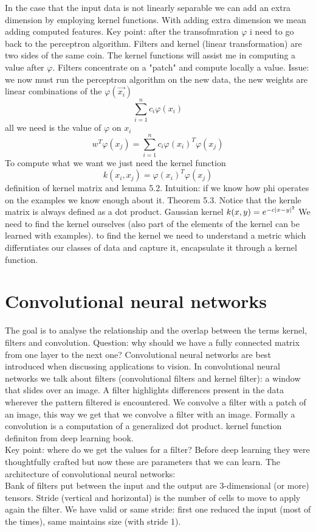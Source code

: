 In the case that the input data is not linearly separable we can add an extra dimension by employing kernel functions. With adding extra dimension we mean adding computed features. Key point: after the transofmration $\varphi$ i need to go back to the perceptron algorithm. Filters and kernel (linear transformation) are two sides of the same coin. The kernel functions will assist me in computing a value after $\varphi$. Filters concentrate on a "patch" and compute locally a value. Issue: we now must run the perceptron algorithm on the new data, the new weights are linear combinations of the $\varphi(\vec{x_i})$
\[ 
    \sum_{i=1}^{n}{c_i\varphi(x_i)}
\]all we need is the value of $\varphi$ on $x_i$
\[ 
    w^T\varphi(x_j)= \sum_{i=1}^{n}{c_i\varphi(x_i)^T\varphi(x_j)}
\]
To compute what we want we just need the kernel function
\[ 
    k(x_i,x_j) = \varphi(x_i)^T\varphi (x_j)
\]
definition of kernel matrix and lemma 5.2. Intuition: if we know how phi operates on the examples we know enough about it. Theorem 5.3. Notice that the kernle matrix is always defined as a dot product. Gaussian kernel $ k(x,y) = e^{-c\left\lvert x-y\right\rvert^2}$
We need to find the kernel ourselves (also part of the elements of the kernel can be learned with examples). to find the kernel we need to understand a metric which differntiates our classes of data and capture it, encapsulate it through a kernel function.

\section{Convolutional neural networks}
The goal is to analyse the relationship and the overlap between the terms kernel, filters and convolution. Question: why should we have a fully connected matrix from one layer to the next one? Convolutional neural networks are best introduced when discussing applications to vision. In convolutional neural networks we talk about filters (convolutional filters and kernel filter): a window that slides over an image. A filter highlights differences present in the data wherever the pattern filtered is encountered. We convolve a filter with a patch of an image, this way we get that we convolve a filter with an image. Formally a convolution is a computation of a generalized dot product. kernel function definiton from deep learning book.\\Key point: where do we get the values for a filter? Before deep learning they were thoughtfully crafted but now these are parameters that we can learn. The architecture of convolutional neural networks: \\Bank of filters put between the input and the output are 3-dimensional (or more) tensors. Stride (vertical and horizontal) is the number of cells to move to apply again the filter. We have valid or same stride: first one reduced the input (most of the times), same maintains size (with stride 1). 